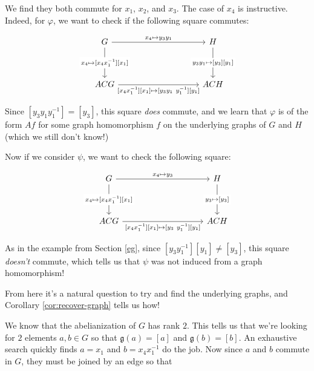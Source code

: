 \documentclass[microtype]{gtpart}
\theoremstyle{definition}
\theoremstyle{theorem}
\begin{document}
We find they both commute for $x_1$, $x_2$, and $x_3$. The case of 
$x_4$ is instructive. Indeed, for $\varphi$, we want to check if the 
following square commutes:

\setlength\mathsurround{0pt}
\[\begin{tikzcd}
	G &&&& H \\
	\\
	ACG &&&& ACH
	\arrow["{x_4 \mapsto y_3 y_1}", from=1-1, to=1-5]
	\arrow["{x_4 \mapsto [x_4 x_1^{-1}][x_1]}"{description}, from=1-1, to=3-1]
	\arrow["{y_3 y_1 \mapsto [y_3][y_1]}"{description}, from=1-5, to=3-5]
	\arrow["{[x_4 x_1^{-1}][x_1] \mapsto [y_3 y_1 \ y_1^{-1}][y_1]}"', from=3-1, to=3-5]
\end{tikzcd}\]
\setlength\mathsurround{0.8pt}

Since $[y_3 y_1 y_1^{-1}] = [y_3]$, this square \emph{does} 
commute, and we learn that $\varphi$ is of the form $A f$ for some 
graph homomorphism $f$ on the underlying graphs of $G$ and $H$ 
(which we still don't know!)

Now if we consider $\psi$, we want to check the following square:

\setlength\mathsurround{0pt}
\[\begin{tikzcd}
	G &&&& H \\
	\\
	ACG &&&& ACH
	\arrow["{x_4 \mapsto y_3}", from=1-1, to=1-5]
	\arrow["{x_4 \mapsto [x_4 x_1^{-1}][x_1]}"{description}, from=1-1, to=3-1]
	\arrow["{y_3 \mapsto [y_3]}"{description}, from=1-5, to=3-5]
	\arrow["{[x_4 x_1^{-1}][x_1] \mapsto [y_3 \ y_1^{-1}][y_1]}"', from=3-1, to=3-5]
\end{tikzcd}\]
\setlength\mathsurround{0.8pt}

As in the example from Section \ref{eg}, since $[y_3 y_1^{-1}][y_1] \neq [y_3]$,
this square \emph{doesn't} commute, which tells us that $\psi$ was not 
induced from a graph homomorphism!

\bigskip

From here it's a natural question to try and find the underlying graphs, 
and Corollary \ref{cor:recover-graph} tells us how!

We know that the abelianization of $G$ has rank $2$. 
This tells us that we're looking for $2$ elements $a,b \in G$ so 
that $\mathfrak{g}(a) = [a]$ and $\mathfrak{g}(b) = [b]$. An exhaustive 
search quickly finds $a = x_1$ and $b = x_4 x_1^{-1}$ do the job. Now 
since $a$ and $b$ commute in $G$, they must be joined by an edge so that 
\end{document}
